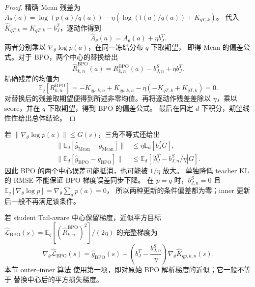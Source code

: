 \begin{proof}
精确 Mean 残差为 $A_\theta(a)=\log(p(a)/q(a))-\eta(\log(t(a)/q(a))+K_{qT,k})$。 代入 $\widehat K_{qT,k}=K_{qT,k}-b_J^T$，逐动作得到
\begin{equation}
 \widehat A_\theta(a)=A_\theta(a)+\eta b_J^T.
\end{equation}
两者分别乘以 $\nabla_\theta\log p(a)$，在同一冻结分布 $q$ 下取期望， 即得 Mean 的偏差公式。对于 BPO，两个中心的替换给出
\begin{equation}
 \widehat R_{k,n}^{\mathrm{BPO}}(a)=R_{k,n}^{\mathrm{BPO}}(a)-b_{J,n}^S+\eta b_J^T.
\end{equation}
精确残差的均值为
\begin{equation}
 \mathbb E_q[R_{k,n}^{\mathrm{BPO}}]
 =-K_{qp,k,n}+K_{qp,k,n}
 -\eta(-K_{qT,k}+K_{qT,k})=0.
\end{equation}
对替换后的残差取期望便得到所述非零均值。再将逐动作残差差除以 $\eta$，乘以 score，并在 $q$ 下取期望，得到 BPO 的偏差公式。 最后在固定 $d$ 下积分，期望线性性给出总体结论。
\end{proof}

若 $\lVert\nabla_\theta\log p(a)\rVert\le G(s)$，三角不等式还给出
\begin{align}
 \lVert\mathbb E_d[\widehat g_{\mathrm{Mean}}-g_{\mathrm{Mean}}]\rVert
 &\le\eta\mathbb E_d[b_J^T G],\\
 \lVert\mathbb E_d[\widehat g_{\mathrm{BPO}}-g_{\mathrm{BPO}}]\rVert
 &\le\mathbb E_d[|b_J^T-b_{J,n}^S/\eta|G].
\end{align}
因此 BPO 的两个中心误差可能抵消，也可能被 $1/\eta$ 放大。 单独降低 teacher KL 的 RMSE 不能保证 BPO 梯度误差同步下降。 在 $p=q$ 时，$b_{J,n}^S=0$ 且 $\mathbb E_q[\nabla_\theta\log p]=\nabla_\theta\sum_a p(a)=0$， 所以两种更新的条件偏差都为零；inner 更新后一般不再满足该条件。

\begin{proposition}
\label{prop:ch2-ta-square-versus-sg}
若 student Tail-aware 中心保留梯度，近似平方目标 $\widehat{\mathcal L}_{\mathrm{BPO}}(s)=\mathbb E_q[(\widehat R_{k,n}^{\mathrm{BPO}})^2]/(2\eta)$ 的完整梯度为
\begin{equation}
 \nabla_\theta\widehat{\mathcal L}_{\mathrm{BPO}}(s)
 =\widehat g_{\mathrm{BPO}}(s)
 +\left(b_J^T-\frac{b_{J,n}^S}{\eta}\right)
   \nabla_\theta\widehat K_{qp,k,n}(s).
\end{equation}
本节 outer--inner 算法 使用第一项，即对原始 BPO 解析梯度的近似；它一般不等于 替换中心后的平方损失梯度。
\end{proposition}

